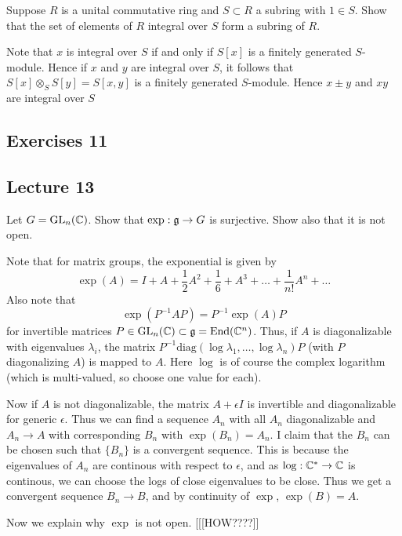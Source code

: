\documentclass[11pt, english]{article}
\begin{document}
\begin{exc}[Exercise 2]
Suppose $R$ is a unital commutative ring and $S \subset R$ a subring with $1 \in S$. Show that the set of elements of $R$ integral over $S$ form a subring of $R$.
\end{exc}
\begin{sol}
 Note that $x$ is integral over $S$ if and only if $S[x]$ is a finitely generated $S$-module. Hence if $x$ and $y$ are integral over $S$, it follows that $S[x] \otimes_S S[y] = S[x,y]$ is a finitely generated $S$-module. Hence $x \pm y$ and $xy$ are integral over $S$
\end{sol}

\subsection{Exercises 11}

\subsection{Lecture 13}
\begin{exc}
 Let $G = \operatorname{GL}_n(\mathbb{C})$. Show that $\exp:\frak g \to G$ is surjective. Show also that it is not open.
\end{exc}
\begin{sol}
Note that for matrix groups, the exponential is given by
$$
\exp(A) = I + A + \frac 12 A^2 + \frac 16+A^3 + \ldots+\frac{1}{n!}A^n + \ldots
$$
Also note that
$$
\exp(P^{-1}AP) = P^{-1} \exp(A) P
$$
for invertible matrices $P \in \operatorname{GL}_n(\mathbb{C}) \subset \frak g=\operatorname{End}(\mathbb{C}^n)$. Thus, if $A$ is diagonalizable with eigenvalues $\lambda_i$, the matrix $P^{-1}\text{diag}(\log \lambda_1,\ldots,\log \lambda_n)P$ (with $P$ diagonalizing $A$) is mapped to $A$. Here $\log$ is of course the complex logarithm (which is multi-valued, so choose one value for each).

Now if $A$ is not diagonalizable, the matrix $A+\epsilon I$ is invertible and diagonalizable for generic $\epsilon$. Thus we can find a sequence $A_n$ with all $A_n$ diagonalizable and $A_n \to A$ with corresponding $B_n$ with $\exp(B_n)=A_n$. I claim that the $B_n$ can be chosen such that $\{ B_n \}$ is a convergent sequence.  This is because the eigenvalues of $A_n$ are continous with respect to $\epsilon$, and as $\log:\mathbb{C}^\ast \to \mathbb{C}$ is continous, we can choose the logs of close eigenvalues to be close. Thus we get a convergent sequence $B_n \to B$, and by continuity of $\exp$, $\exp(B)=A$.

Now we explain why $\exp$ is not open. [[[HOW????]]
\end{sol}
\end{document}
